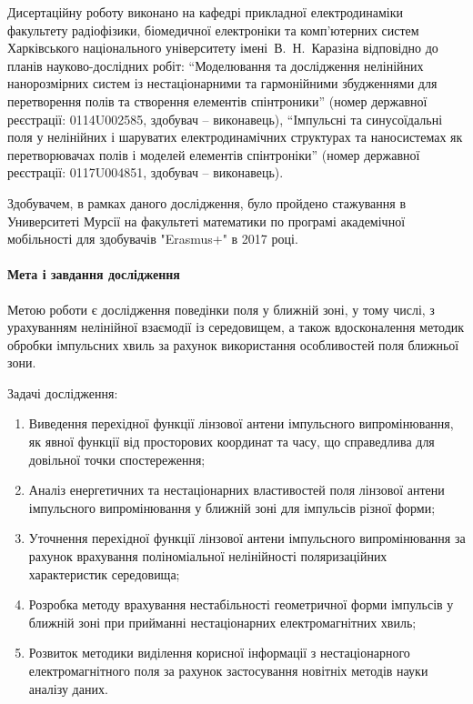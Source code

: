 Дисертаційну роботу виконано на кафедрі прикладної електродинаміки факультету 
радіофізики, біомедичної електроніки та комп’ютерних систем Харківського 
національного університету імені~В.~Н.~Каразіна відповідно до планів 
науково-дослідних робіт: ``Моделювання та дослідження 
нелінійних нанорозмірних систем із нестаціонарними та гармонійними 
збудженнями для перетворення полів та створення елементів спінтроники'' 
(номер державної реєстрації: 0114U002585, здобувач -- виконавець), 
``Імпульсні та синусоїдальні поля у нелінійних і шаруватих електродинамічних 
структурах та наносистемах як перетворювачах полів і моделей елементів 
спінтроніки'' (номер державної реєстрації: 0117U004851, здобувач -- виконавець).

Здобувачем, в рамках даного дослідження, було пройдено стажування в 
Университеті Мурсії на факультеті математики по програмі академічної 
мобільності для здобувачів "Erasmus+" в 2017 році.

\paragraph{Мета і завдання дослідження}

Метою роботи є дослідження поведінки поля у ближній зоні, у тому числі, з
урахуванням нелінійної взаємодії із середовищем, а також вдосконалення 
методик обробки імпульсних хвиль за рахунок використання особливостей поля 
ближньої зони.

Задачі дослідження:

\begin{enumerate}

\item Виведення перехідної функції лінзової антени імпульсного 
випромінювання, як явної функції від просторових координат та часу, що 
справедлива для довільної точки спостереження;

\item Аналіз енергетичних та нестаціонарних властивостей поля лінзової антени 
імпульсного випромінювання у ближній зоні для імпульсів різної форми;

\item Уточнення перехідної функції лінзової антени імпульсного 
випромінювання за рахунок врахування поліноміальної нелінійності 
поляризаційних характеристик середовища;

\item Розробка методу врахування нестабільності геометричної 
форми імпульсів у ближній зоні при прийманні нестаціонарних електромагнітних 
хвиль;

\item Розвиток методики виділення корисної інформації з нестаціонарного 
електромагнітного поля за рахунок застосування новітніх методів науки аналізу 
даних.

\end{enumerate}

